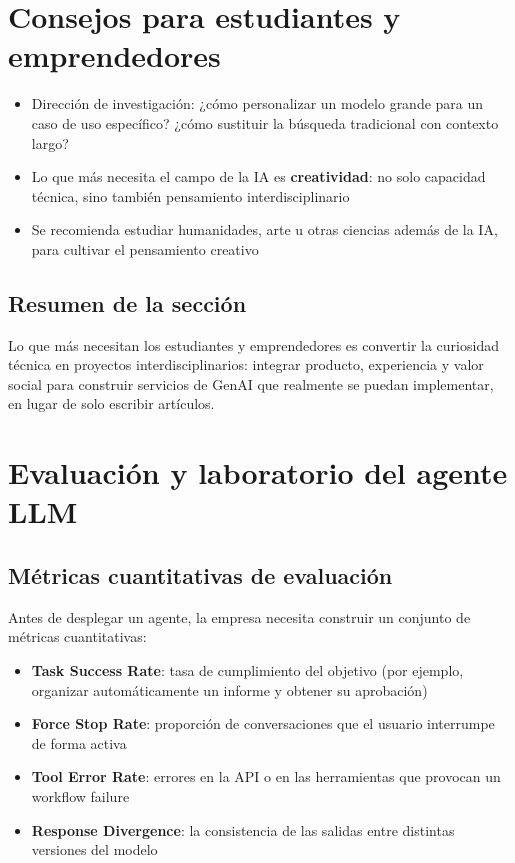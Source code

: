 \documentclass[a4paper]{article}
\begin{document}
\section{Consejos para estudiantes y emprendedores}

\begin{itemize}
    \item Dirección de investigación: ¿cómo personalizar un modelo grande para un caso de uso específico? ¿cómo sustituir la búsqueda tradicional con contexto largo?
    \item Lo que más necesita el campo de la IA es \textbf{creatividad}: no solo capacidad técnica, sino también pensamiento interdisciplinario
    \item Se recomienda estudiar humanidades, arte u otras ciencias además de la IA, para cultivar el pensamiento creativo
\end{itemize}

\subsection{Resumen de la sección}

Lo que más necesitan los estudiantes y emprendedores es convertir la curiosidad técnica en proyectos interdisciplinarios: integrar producto, experiencia y valor social para construir servicios de GenAI que realmente se puedan implementar, en lugar de solo escribir artículos.

\section{Evaluación y laboratorio del agente LLM}

\subsection{Métricas cuantitativas de evaluación}

Antes de desplegar un agente, la empresa necesita construir un conjunto de métricas cuantitativas:

\begin{itemize}
    \item \textbf{Task Success Rate}: tasa de cumplimiento del objetivo (por ejemplo, organizar automáticamente un informe y obtener su aprobación)
    \item \textbf{Force Stop Rate}: proporción de conversaciones que el usuario interrumpe de forma activa
    \item \textbf{Tool Error Rate}: errores en la API o en las herramientas que provocan un workflow failure
    \item \textbf{Response Divergence}: la consistencia de las salidas entre distintas versiones del modelo
\end{itemize}
\end{document}
